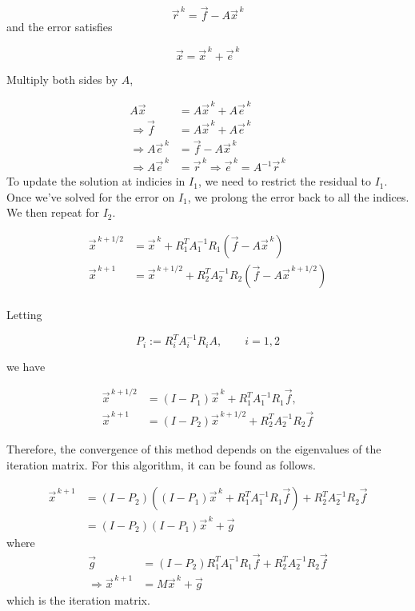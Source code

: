 \begin{equation*}
    \vec{r}^{\, k} = \vec{f} - A\vec{x}^{\, k}
\end{equation*}
and the error satisfies

\begin{equation*}
    \vec{x} = \vec{x}^{\, k} + \vec{e}^{\, k}
\end{equation*}

Multiply both sides by $A$,

\begin{align*}
    A\vec{x} &= A\vec{x}^{\, k} + A\vec{e}^{\, k}\\
    \Rightarrow \vec{f} &= A\vec{x}^{\, k} + A\vec{e}^{\, k}\\
    \Rightarrow A\vec{e}^{\, k} &=\vec{f} - A\vec{x}^{\, k} \\
    \Rightarrow A\vec{e}^{\, k} &=\vec{r}^{\, k}
    \Rightarrow \vec{e}^{\, k} =A^{-1}\vec{r}^{\, k}
\end{align*}
To update the solution at indicies in $I_1$, we need to restrict the residual to $I_1$. Once we've solved for the error on $I_1$, we prolong the error back to all the indices. We then repeat for $I_2$.

\begin{align*}
    \vec{x}^{\, k + 1/2} &= \vec{x}^{\, k} +
    R_1^T A_1^{-1} R_1
    \left(\vec{f} - A\vec{x}^{\, k}\right)\\
    \vec{x}^{\, k + 1} &= \vec{x}^{\, k + 1/2} +
    R_2^T A_2^{-1} R_2
    \left(\vec{f} - A\vec{x}^{\, k + 1/2}\right)\\
\end{align*}

Letting

\begin{equation*}
    P_i := R_i^T A_i^{-1} R_i A, \qquad i=1,2
\end{equation*}

we have

\begin{align*}
    \vec{x}^{\, k + 1/2} &= (I - P_1)\vec{x}^{\, k} +
    R_1^T A_1^{-1} R_1\vec{f},\\
    \vec{x}^{\, k + 1} &=(I - P_2) \vec{x}^{\, k + 1/2} +
    R_2^T A_2^{-1} R_2 \vec{f}
\end{align*}

Therefore, the convergence of this method depends on the eigenvalues of the iteration matrix. For this algorithm, it can be found as follows.

\begin{align*}
    \vec{x}^{\, k + 1} &= (I - P_2) \left((I - P_1)\vec{x}^{\, k} +
    R_1^T A_1^{-1} R_1\vec{f}\right) +
    R_2^T A_2^{-1} R_2 \vec{f}\\
    &= (I - P_2)(I - P_1) \vec{x}^{\, k}+ \vec{g}
\end{align*}
where
\begin{align*}
    \vec{g}&=(I - P_2)R_1^T A_1^{-1} R_1\vec{f} + R_2^T A_2^{-1} R_2 \vec{f}\\
    \Rightarrow \vec{x}^{\, k + 1} &= M\vec{x}^{\, k} + \vec{g}
\end{align*}
which is the iteration matrix.


